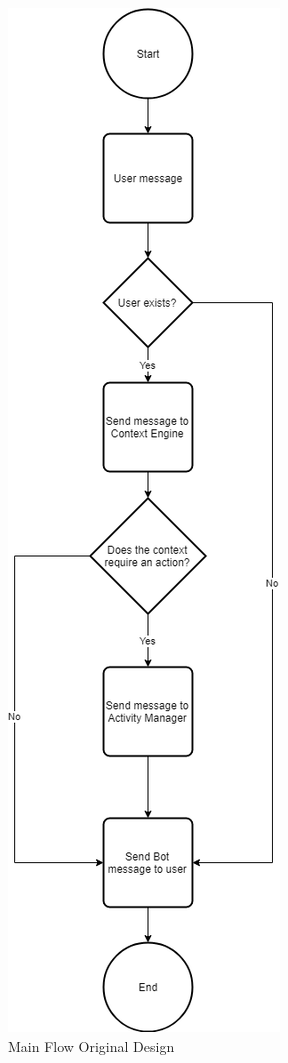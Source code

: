 \begin{center}
	\begin{figure}[h!]
		\centering
		\includegraphics[scale=0.4]{./images/4-main-flow-ori}
		\caption{Main Flow Original Design}
		\label{4_main_flow_ori}
	\end{figure}
\end{center}

